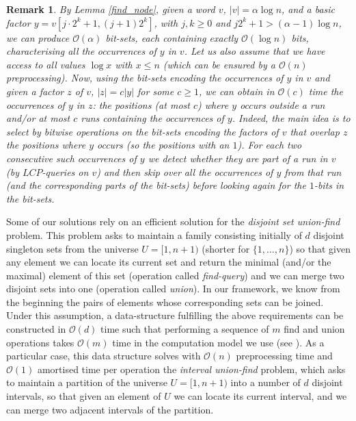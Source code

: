 \documentclass[final]{dmtcs-episciences}
\newcommand{\bigo}{{\mathcal O}}
\newcommand{\LCP}{{\mathit{LCP}}}
\newtheorem{remark}{Remark}
\begin{document}
\begin{remark}\label{find_occ_small_range}
By Lemma \ref{find_node}, given a word $v$, $|v|=\alpha \log n$,  and a basic factor $y=v[j\cdot2^k+1,(j+1)2^{k}]$, with $j,k\geq 0$ and $j2^k+1> (\alpha-1)\log n$, we can produce $\bigo(\alpha)$ bit-sets, each containing exactly $\bigo(\log n)$ bits, characterising all the occurrences of $y$ in $v$. Let us also assume that we have access to all values $\log x$ with $x\leq n$ (which can be ensured by a $\bigo(n)$ preprocessing). Now, using the bit-sets encoding the occurrences of $y$ in $v$ and given a factor $z$ of $v$, $|z|=c|y|$ for some $c\geq 1$, we can obtain in $\bigo(c)$ time the occurrences of $y$ in $z$: the positions (at most $c$) where $y$ occurs outside a run and/or at most $c$ runs containing the occurrences of $y$. Indeed, the main idea is to select by bitwise operations on the bit-sets encoding the factors of $v$ that overlap $z$ the positions where $y$ occurs (so the positions with an $1$). For each two consecutive such occurrences of $y$ we detect whether they are part of a run in $v$ (by $\LCP$-queries on $v$) and then skip over all the occurrences of $y$ from that run (and the corresponding parts of the bit-sets) before looking again for the $1$-bits in the bit-sets.
 \end{remark}

Some of our solutions rely on an efficient solution for the \emph{disjoint set union-find} problem. This problem asks to maintain a family consisting initially of $d$ disjoint singleton sets from the universe $U=[1,n+1)$ (shorter for $\{1,\ldots,n\}$) so that given any element we can locate its current set and return the minimal (and/or the maximal) element of this set (operation called {\em find-query}) and we can merge two disjoint sets into one (operation called {\em union}). In our framework, we know from the beginning the pairs of elements whose corresponding sets can be joined. Under this assumption, a data-structure fulfilling the above requirements can be constructed in $\bigo(d)$ time such that performing a sequence of $m$ find and union operations takes $\bigo(m)$ time in the computation model we use (see \cite{Gabow83}). As a particular case, this data structure solves with $\bigo(n)$ preprocessing time and $\bigo(1)$ amortised time per operation the \emph{interval union-find} problem, which asks to maintain a partition of the universe $U=[1,n+1)$ into a number of $d$ disjoint intervals, so that given an element of $U$ we can locate its current interval, and we can merge two adjacent intervals of the partition. 
\end{document}
